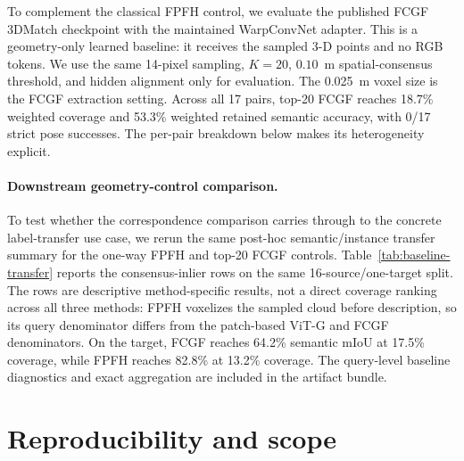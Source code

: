\documentclass[10pt,twocolumn]{article}
\begin{document}
To complement the classical FPFH control, we evaluate the published FCGF
3DMatch checkpoint with the maintained WarpConvNet adapter. This is a
geometry-only learned baseline: it receives the sampled 3-D points and no RGB
tokens. We use the same 14-pixel sampling, $K=20$, $0.10$~m spatial-consensus
threshold, and hidden alignment only for evaluation. The 0.025~m voxel size is
the FCGF extraction setting. Across all 17 pairs, top-20 FCGF reaches 18.7\%
weighted coverage and 53.3\% weighted retained semantic accuracy, with 0/17 strict
pose successes. The per-pair breakdown below makes its heterogeneity explicit.

\begin{table}[t]
\centering
\scriptsize
\resizebox{\textwidth}{!}{}
\caption{Learned geometry-only FCGF control at top-$K=20$.}
\label{tab:fcgf}
\end{table}

\paragraph{Downstream geometry-control comparison.}
To test whether the correspondence comparison carries through to the concrete
label-transfer use case, we rerun the same post-hoc semantic/instance transfer
summary for the one-way FPFH and top-20 FCGF controls. Table~\ref{tab:baseline-transfer}
reports the consensus-inlier rows on the same 16-source/one-target split.
The rows are descriptive method-specific results, not a direct coverage ranking
across all three methods: FPFH voxelizes the sampled cloud before description,
so its query denominator differs from the patch-based ViT-G and FCGF
denominators. On the target, FCGF reaches 64.2\% semantic mIoU at 17.5\%
coverage, while FPFH reaches 82.8\% at 13.2\% coverage. The
query-level baseline diagnostics and exact aggregation are included in the
artifact bundle.

\begin{table}[t]
\centering
\scriptsize
\resizebox{\columnwidth}{!}{}
\caption{Downstream label-transfer control. All rows use spatial-consensus
inliers; semantic and instance mIoU are class-balanced over retained queries.
FPFH uses voxelized points and therefore has a different point denominator.}
\label{tab:baseline-transfer}
\end{table}

\section{Reproducibility and scope}
\end{document}
